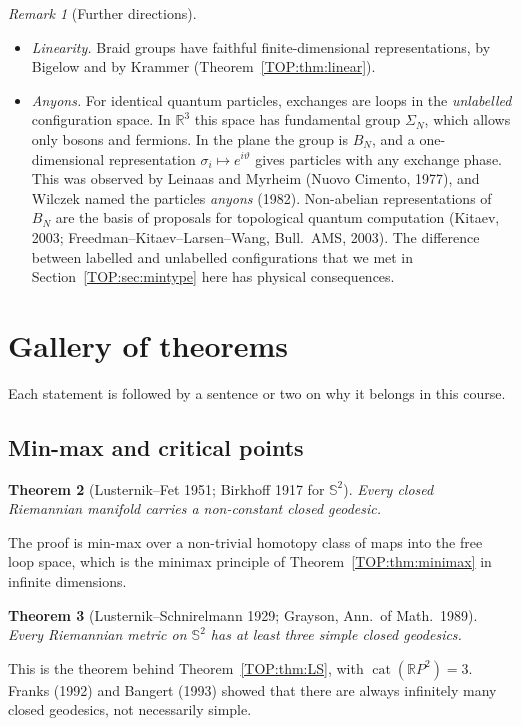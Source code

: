 \documentclass[11pt,openany]{book}
\theoremstyle{plain}
\newtheorem{theorem}{Theorem}[chapter]
\theoremstyle{definition}
\theoremstyle{remark}
\newtheorem{remark}[theorem]{Remark}
\newcommand{\R}{\mathbb{R}}
\newcommand{\Sph}{\mathbb{S}}          %
\begin{document}
\begin{remark}[Further directions]\leavevmode
\begin{itemize}[nosep]
\item \emph{Linearity.} Braid groups have faithful finite-dimensional representations, by Bigelow and by
  Krammer (Theorem~\ref{TOP:thm:linear}).
\item \emph{Anyons.} For identical quantum particles, exchanges are loops in the \emph{unlabelled}
  configuration space. In $\R^3$ this space has fundamental group $\Sigma_N$, which allows only bosons and fermions. In the plane
  the group is $B_N$, and a one-dimensional representation $\sigma_i\mapsto e^{i\vartheta}$ gives particles with
  any exchange phase. This was observed by Leinaas and Myrheim (Nuovo Cimento, 1977), and Wilczek named the
  particles \emph{anyons} (1982). Non-abelian representations of $B_N$ are the basis of proposals for
  topological quantum computation (Kitaev, 2003; Freedman--Kitaev--Larsen--Wang, Bull.\ AMS, 2003). The
  difference between labelled and unlabelled configurations that we met in Section~\ref{TOP:sec:mintype}
  here has physical consequences.
\end{itemize}
\end{remark}

\section{Gallery of theorems}
\label{TOP:sec:gallery}

Each statement is followed by a sentence or two on why it belongs in this course.

\subsection*{Min-max and critical points}

\begin{theorem}[Lusternik--Fet 1951; Birkhoff 1917 for $\Sph^2$]
Every closed Riemannian manifold carries a non-constant closed geodesic.
\end{theorem}
\noindent The proof is min-max over a non-trivial homotopy class of maps into the free loop space, which
is the minimax principle of Theorem~\ref{TOP:thm:minimax} in infinite dimensions.

\begin{theorem}[Lusternik--Schnirelmann 1929; Grayson, Ann.\ of Math.\ 1989]
Every Riemannian metric on $\Sph^2$ has at least three simple closed geodesics.
\end{theorem}
\noindent This is the theorem behind Theorem~\ref{TOP:thm:LS}, with $\operatorname{cat}(\R P^2)=3$.
Franks (1992) and Bangert (1993) showed that there are always infinitely many closed geodesics, not
necessarily simple.
\end{document}
